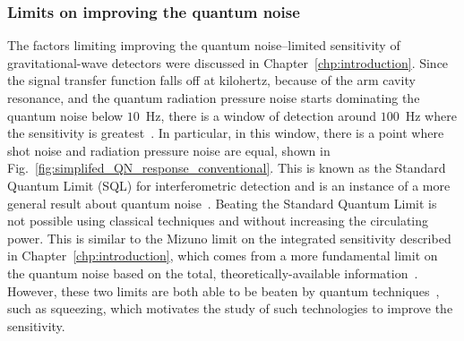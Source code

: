 
\subsubsection{Limits on improving the quantum noise}

The factors limiting improving the quantum noise--limited sensitivity of gravitational-wave detectors were discussed in Chapter~\ref{chp:introduction}. Since the signal transfer function falls off at kilohertz, because of the arm cavity resonance, and the quantum radiation pressure noise starts dominating the quantum noise below $10$~Hz, there is a window of detection around $100$~Hz where the sensitivity is greatest~\cite{}. In particular, in this window, there is a point where shot noise and radiation pressure noise are equal, shown in Fig.~\ref{fig:simplifed_QN_response_conventional}.  %
This is known as the Standard Quantum Limit (SQL) for interferometric detection and is an instance of a more general result about quantum noise~\cite{}. Beating the Standard Quantum Limit is not possible using classical techniques  and without increasing the circulating power. This is similar to the Mizuno limit on the integrated sensitivity described in Chapter~\ref{chp:introduction}, which comes from a more fundamental limit on the quantum noise based on the total, theoretically-available information~\cite{miaoFundamentalQuantumLimit2017}. However, these two limits are both able to be beaten  by quantum techniques~\cite{miaoFundamentalQuantumLimit2017,}, such as squeezing, which motivates the study of such technologies to improve the sensitivity.

